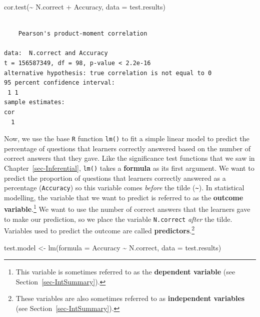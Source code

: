 \documentclass[
  letterpaper,
  DIV=11,
  numbers=noendperiod]{scrreprt}
\newenvironment{Shaded}{\begin{snugshade}}{\end{snugshade}}
\newcommand{\AttributeTok}[1]{\textcolor[rgb]{0.40,0.45,0.13}{#1}}
\newcommand{\FunctionTok}[1]{\textcolor[rgb]{0.28,0.35,0.67}{#1}}
\newcommand{\NormalTok}[1]{\textcolor[rgb]{0.00,0.23,0.31}{#1}}
\newcommand{\OtherTok}[1]{\textcolor[rgb]{0.00,0.23,0.31}{#1}}
\newcommand{\SpecialCharTok}[1]{\textcolor[rgb]{0.37,0.37,0.37}{#1}}
\begin{document}
\begin{Shaded}
\begin{Highlighting}[]
\FunctionTok{cor.test}\NormalTok{(}\SpecialCharTok{\textasciitilde{}}\NormalTok{ N.correct }\SpecialCharTok{+}\NormalTok{ Accuracy,}
         \AttributeTok{data =}\NormalTok{ test.results)}
\end{Highlighting}
\end{Shaded}

\begin{verbatim}

    Pearson's product-moment correlation

data:  N.correct and Accuracy
t = 156587349, df = 98, p-value < 2.2e-16
alternative hypothesis: true correlation is not equal to 0
95 percent confidence interval:
 1 1
sample estimates:
cor 
  1 
\end{verbatim}

Now, we use the base \texttt{R} function \texttt{lm()} to fit a simple
linear model to predict the percentage of questions that learners
correctly answered based on the number of correct answers that they
gave. Like the significance test functions that we saw in
Chapter~\ref{sec-Inferential}, \texttt{lm()} takes a \textbf{formula} as
its first argument. We want to predict the proportion of questions that
learners correctly answered as a percentage (\texttt{Accuracy}) so this
variable comes \emph{before} the tilde (\texttt{\textasciitilde{}}). In
statistical modelling, the variable that we want to predict is referred
to as the \textbf{outcome variable}.\footnote{This variable is sometimes
  referred to as the \textbf{dependent variable} (see
  Section~\ref{sec-IntSummary}).} We want to use the number of correct
answers that the learners gave to make our prediction, so we place the
variable \texttt{N.correct} \emph{after} the tilde. Variables used to
predict the outcome are called \textbf{predictors}.\footnote{These
  variables are also sometimes referred to as \textbf{independent
  variables} (see Section~\ref{sec-IntSummary}).}

\begin{Shaded}
\begin{Highlighting}[]
\NormalTok{test.model }\OtherTok{\textless{}{-}} \FunctionTok{lm}\NormalTok{(}\AttributeTok{formula =}\NormalTok{ Accuracy }\SpecialCharTok{\textasciitilde{}}\NormalTok{ N.correct,}
                 \AttributeTok{data =}\NormalTok{ test.results)}
\end{Highlighting}
\end{Shaded}
\end{document}
